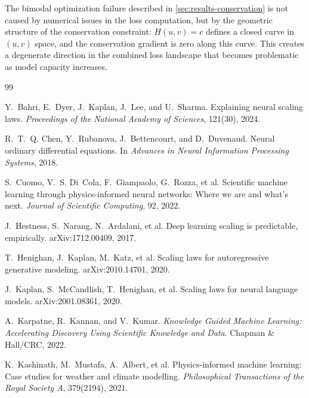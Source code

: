 \documentclass[11pt]{article}
\begin{document}
The bimodal optimization failure described in \cref{sec:results-conservation} is not caused by numerical issues in the loss computation, but by the geometric structure of the conservation constraint: $H(u,v) = c$ defines a closed curve in $(u,v)$ space, and the conservation gradient is zero along this curve.
This creates a degenerate direction in the combined loss landscape that becomes problematic as model capacity increases.


\begin{thebibliography}{99}

Y.~Bahri, E.~Dyer, J.~Kaplan, J.~Lee, and U.~Sharma.
\newblock Explaining neural scaling laws.
\newblock \emph{Proceedings of the National Academy of Sciences}, 121(30), 2024.

R.~T.~Q. Chen, Y.~Rubanova, J.~Bettencourt, and D.~Duvenaud.
\newblock Neural ordinary differential equations.
\newblock In \emph{Advances in Neural Information Processing Systems}, 2018.

S.~Cuomo, V.~S. Di~Cola, F.~Giampaolo, G.~Rozza, et al.
\newblock Scientific machine learning through physics-informed neural networks:
  Where we are and what's next.
\newblock \emph{Journal of Scientific Computing}, 92, 2022.

J.~Hestness, S.~Narang, N.~Ardalani, et al.
\newblock Deep learning scaling is predictable, empirically.
\newblock arXiv:1712.00409, 2017.

T.~Henighan, J.~Kaplan, M.~Katz, et al.
\newblock Scaling laws for autoregressive generative modeling.
\newblock arXiv:2010.14701, 2020.

J.~Kaplan, S.~McCandlish, T.~Henighan, et al.
\newblock Scaling laws for neural language models.
\newblock arXiv:2001.08361, 2020.

A.~Karpatne, R.~Kannan, and V.~Kumar.
\newblock \emph{Knowledge Guided Machine Learning: Accelerating Discovery Using Scientific Knowledge and Data}.
\newblock Chapman \& Hall/CRC, 2022.

K.~Kashinath, M.~Mustafa, A.~Albert, et al.
\newblock Physics-informed machine learning: Case studies for weather and climate modelling.
\newblock \emph{Philosophical Transactions of the Royal Society A}, 379(2194), 2021.


\end{thebibliography}
\end{document}
